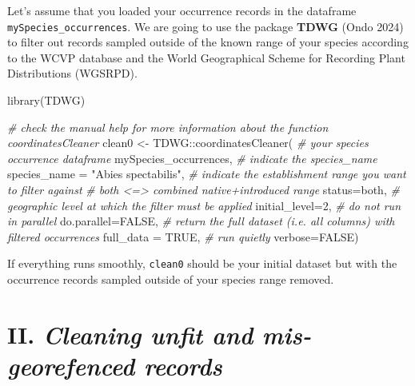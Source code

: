 \documentclass[
]{article}
\newenvironment{Shaded}{\begin{snugshade}}{\end{snugshade}}
\newcommand{\AttributeTok}[1]{\textcolor[rgb]{0.77,0.63,0.00}{#1}}
\newcommand{\CommentTok}[1]{\textcolor[rgb]{0.56,0.35,0.01}{\textit{#1}}}
\newcommand{\ConstantTok}[1]{\textcolor[rgb]{0.00,0.00,0.00}{#1}}
\newcommand{\DecValTok}[1]{\textcolor[rgb]{0.00,0.00,0.81}{#1}}
\newcommand{\FunctionTok}[1]{\textcolor[rgb]{0.00,0.00,0.00}{#1}}
\newcommand{\NormalTok}[1]{#1}
\newcommand{\OtherTok}[1]{\textcolor[rgb]{0.56,0.35,0.01}{#1}}
\newcommand{\SpecialCharTok}[1]{\textcolor[rgb]{0.00,0.00,0.00}{#1}}
\newcommand{\StringTok}[1]{\textcolor[rgb]{0.31,0.60,0.02}{#1}}
\begin{document}
Let's assume that you loaded your occurrence records in the dataframe
\texttt{mySpecies\_occurrences}. We are going to use the package
\textbf{TDWG} (Ondo 2024) to filter out records sampled outside of the
known range of your species according to the WCVP database and the World
Geographical Scheme for Recording Plant Distributions (WGSRPD).

\begin{Shaded}
\begin{Highlighting}[]
\FunctionTok{library}\NormalTok{(TDWG)}

\CommentTok{\# check the manual help for more information about the function \textasciigrave{}coordinatesCleaner\textasciigrave{}}
\NormalTok{clean0 }\OtherTok{\textless{}{-}}\NormalTok{ TDWG}\SpecialCharTok{::}\FunctionTok{coordinatesCleaner}\NormalTok{(}
                  \CommentTok{\# your species occurrence dataframe}
\NormalTok{                   mySpecies\_occurrences,}
                   \CommentTok{\# indicate the species\_name}
                   \AttributeTok{species\_name =} \StringTok{"Abies spectabilis"}\NormalTok{,}
                   \CommentTok{\# indicate the establishment range you want to filter against}
                   \CommentTok{\# both \textless{}=\textgreater{} combined native+introduced range}
                   \AttributeTok{status=}\StringTok{\textquotesingle{}both\textquotesingle{}}\NormalTok{,}
                   \CommentTok{\# geographic level at which the filter must be applied}
                   \AttributeTok{initial\_level=}\DecValTok{2}\NormalTok{,}
                   \CommentTok{\# do not run in parallel}
                   \AttributeTok{do.parallel=}\ConstantTok{FALSE}\NormalTok{,}
                   \CommentTok{\# return the full dataset (i.e. all columns) with filtered occurrences}
                   \AttributeTok{full\_data =} \ConstantTok{TRUE}\NormalTok{,}
                   \CommentTok{\# run quietly}
                   \AttributeTok{verbose=}\ConstantTok{FALSE}\NormalTok{)}
\end{Highlighting}
\end{Shaded}

If everything runs smoothly, \texttt{clean0} should be your initial
dataset but with the occurrence records sampled outside of your species
range removed.

\hypertarget{ii.-cleaning-unfit-and-mis-georefenced-records}{%
\section{\texorpdfstring{II. \emph{Cleaning unfit and mis-georefenced
records}}{II. Cleaning unfit and mis-georefenced records}}\label{ii.-cleaning-unfit-and-mis-georefenced-records}}
\end{document}
